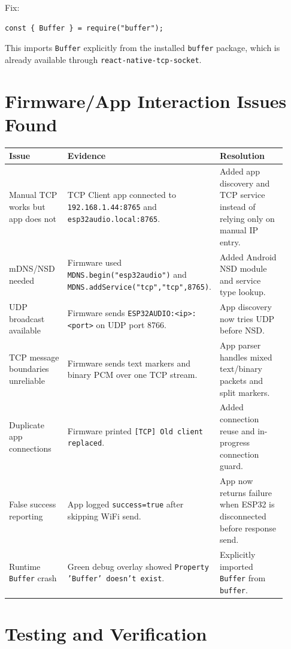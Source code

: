 \documentclass[11pt,a4paper]{article}
\begin{document}
Fix:

\begin{lstlisting}[style=logstyle]
const { Buffer } = require("buffer");
\end{lstlisting}

This imports \texttt{Buffer} explicitly from the installed \texttt{buffer} package, which is already available through \texttt{react-native-tcp-socket}.

\section{Firmware/App Interaction Issues Found}

\begin{longtable}{p{0.24\linewidth}p{0.36\linewidth}p{0.32\linewidth}}
\toprule
Issue & Evidence & Resolution \\
\midrule
\endhead
Manual TCP works but app does not & TCP Client app connected to \texttt{192.168.1.44:8765} and \texttt{esp32audio.local:8765}. & Added app discovery and TCP service instead of relying only on manual IP entry. \\
\addlinespace
mDNS/NSD needed & Firmware used \texttt{MDNS.begin("esp32audio")} and \texttt{MDNS.addService("tcp","tcp",8765)}. & Added Android NSD module and service type lookup. \\
\addlinespace
UDP broadcast available & Firmware sends \texttt{ESP32AUDIO:<ip>:<port>} on UDP port 8766. & App discovery now tries UDP before NSD. \\
\addlinespace
TCP message boundaries unreliable & Firmware sends text markers and binary PCM over one TCP stream. & App parser handles mixed text/binary packets and split markers. \\
\addlinespace
Duplicate app connections & Firmware printed \texttt{[TCP] Old client replaced}. & Added connection reuse and in-progress connection guard. \\
\addlinespace
False success reporting & App logged \texttt{success=true} after skipping WiFi send. & App now returns failure when ESP32 is disconnected before response send. \\
\addlinespace
Runtime \texttt{Buffer} crash & Green debug overlay showed \texttt{Property 'Buffer' doesn't exist}. & Explicitly imported \texttt{Buffer} from \texttt{buffer}. \\
\bottomrule
\end{longtable}

\section{Testing and Verification}
\end{document}
